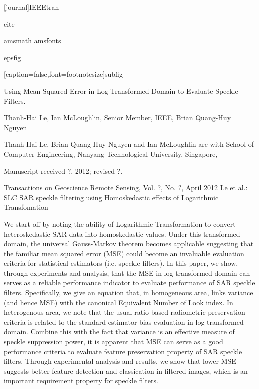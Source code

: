 
[journal]IEEEtran


cite 

 
amsmath
amsfonts

epsfig 


[caption=false,font=footnotesize]subfig 


 
	Using Mean-Squared-Error in Log-Transformed Domain to Evaluate Speckle Filters.



Thanh-Hai Le,
        Ian McLoughlin, Senior Member, IEEE, 
	Brian Quang-Huy Nguyen 
	
	
Thanh-Hai Le, Brian Quang-Huy Nguyen and Ian McLoughlin are with School of Computer Engineering, 
Nanyang Technological University, Singapore,

Manuscript received ?, 2012; revised ?.

Transactions on Geoscience  Remote Sensing, Vol. ?, No. ?, April 2012
 Le et al.: SLC SAR speckle filtering using Homoskedastic effects of Logarithmic Transfomation 







We start off by noting the ability of Logarithmic Transformation to convert heteroskedastic SAR data into homoskedastic values. 
Under this transformed domain, the universal Gauss-Markov theorem becomes applicable suggesting that the familiar mean squared error (MSE) could become an invaluable evaluation criteria for statistical estimators (i.e. speckle filters). 
In this paper, we show, through experiments and analysis, that the MSE in log-transformed domain can serves as a reliable performance indicator to evaluate performance of SAR speckle filters.
Specifically, we give an equation that, in homogeneous area, links variance (and hence MSE) with the canonical Equivalent Number of Look index.
In heterogenous area, we note that the usual ratio-based radiometric preservation criteria is related to the standard estimator bias evaluation in log-transformed domain. 
Combine this with the fact that variance is an effective measure of speckle suppression power, it is apparent that MSE can serve as a good performance criteria to evaluate feature preservation property of SAR speckle filters.
Through experimental analysis and results, we show that lower MSE suggests better feature detection and classication in filtered images, 
	which is an important requirement property for speckle filters.







